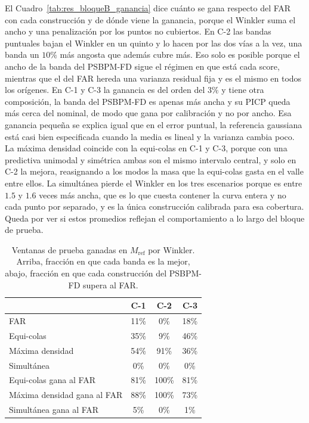 El Cuadro~\ref{tab:res_bloqueB_ganancia} dice cuánto se gana respecto del FAR con cada construcción y de dónde viene la ganancia, porque el Winkler suma el ancho y una penalización por los puntos no cubiertos. En C-2 las bandas puntuales bajan el Winkler en un quinto y lo hacen por las dos vías a la vez, una banda un $10\%$ más angosta que además cubre más. Eso solo es posible porque el ancho de la banda del PSBPM-FD sigue el régimen en que está cada score, mientras que el del FAR hereda una varianza residual fija y es el mismo en todos los orígenes. En C-1 y C-3 la ganancia es del orden del $3\%$ y tiene otra composición, la banda del PSBPM-FD es apenas más ancha y su PICP queda más cerca del nominal, de modo que gana por calibración y no por ancho. Esa ganancia pequeña se explica igual que en el error puntual, la referencia gaussiana está casi bien especificada cuando la media es lineal y la varianza cambia poco. La máxima densidad coincide con la equi-colas en C-1 y C-3, porque con una predictiva unimodal y simétrica ambas son el mismo intervalo central, y solo en C-2 la mejora, reasignando a los modos la masa que la equi-colas gasta en el valle entre ellos. La simultánea pierde el Winkler en los tres escenarios porque es entre $1.5$ y $1.6$ veces más ancha, que es lo que cuesta contener la curva entera y no cada punto por separado, y es la única construcción calibrada para esa cobertura. Queda por ver si estos promedios reflejan el comportamiento a lo largo del bloque de prueba.

\begin{table}[H]
\centering\small
\caption{Ventanas de prueba ganadas en $M_{\mathrm{ref}}$ por Winkler. Arriba, fracción en que cada banda es la mejor, abajo, fracción en que cada construcción del PSBPM-FD supera al FAR.}
\label{tab:res_bloqueB_ventanas}
\begin{tabular}{l ccc}
\hline
 & C-1 & C-2 & C-3 \\
\hline
FAR & 11\% & 0\% & 18\% \\
Equi-colas & 35\% & 9\% & 46\% \\
Máxima densidad & 54\% & 91\% & 36\% \\
Simultánea & 0\% & 0\% & 0\% \\
\hline
Equi-colas gana al FAR & 81\% & 100\% & 81\% \\
Máxima densidad gana al FAR & 88\% & 100\% & 73\% \\
Simultánea gana al FAR & 5\% & 0\% & 1\% \\
\hline
\end{tabular}
\end{table}

